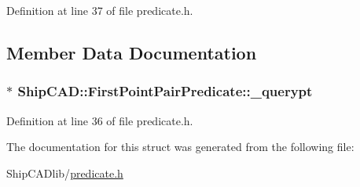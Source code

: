 Definition at line 37 of file predicate.\+h.



\subsection{Member Data Documentation}
\subsubsection[{\texorpdfstring{\+\_\+querypt}{_querypt}}]{$\ast$ Ship\+C\+A\+D\+::\+First\+Point\+Pair\+Predicate\+::\+\_\+querypt}\hypertarget{structShipCAD_1_1FirstPointPairPredicate_ad0ddbf84638ac51733b015bffca85e5f}{}\label{structShipCAD_1_1FirstPointPairPredicate_ad0ddbf84638ac51733b015bffca85e5f}


Definition at line 36 of file predicate.\+h.



The documentation for this struct was generated from the following file\+:\begin{DoxyCompactItemize}
\item 
Ship\+C\+A\+Dlib/\hyperlink{predicate_8h}{predicate.\+h}\end{DoxyCompactItemize}
